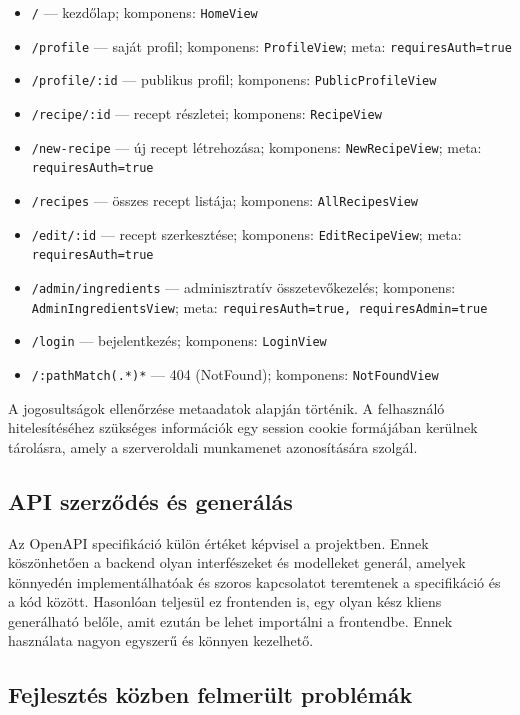 \begin{itemize}
	\item \texttt{/} — kezdőlap; komponens: \texttt{HomeView}
	\item \texttt{/profile} — saját profil; komponens: \texttt{ProfileView}; meta: \texttt{requiresAuth=true}
	\item \texttt{/profile/:id} — publikus profil; komponens: \texttt{PublicProfileView}
	\item \texttt{/recipe/:id} — recept részletei; komponens: \texttt{RecipeView}
	\item \texttt{/new-recipe} — új recept létrehozása; komponens: \texttt{NewRecipeView}; meta: \texttt{requiresAuth=true}
	\item \texttt{/recipes} — összes recept listája; komponens: \texttt{AllRecipesView}
	\item \texttt{/edit/:id} — recept szerkesztése; komponens: \texttt{EditRecipeView}; meta: \texttt{requiresAuth=true}
	\item \texttt{/admin/ingredients} — adminisztratív összetevőkezelés; komponens: \texttt{AdminIngredientsView}; meta: \texttt{requiresAuth=true, requiresAdmin=true}
	\item \texttt{/login} — bejelentkezés; komponens: \texttt{LoginView}
	\item \texttt{/:pathMatch(.*)*} — 404 (NotFound); komponens: \texttt{NotFoundView}
\end{itemize}

A jogosultságok ellenőrzése metaadatok alapján történik. A felhasználó hitelesítéséhez szükséges információk egy session cookie formájában kerülnek tárolásra, amely a szerveroldali munkamenet azonosítására szolgál. 

\subsection{API szerződés és generálás}

Az OpenAPI specifikáció külön értéket képvisel a projektben. Ennek köszönhetően a backend olyan interfészeket és modelleket generál, amelyek könnyedén implementálhatóak és szoros kapcsolatot teremtenek a specifikáció és a kód között. Hasonlóan teljesül ez frontenden is, egy olyan kész kliens generálható belőle, amit ezután be lehet importálni a frontendbe. Ennek használata nagyon egyszerű és könnyen kezelhető\cite{openapi}.

\subsection{Fejlesztés közben felmerült problémák}

